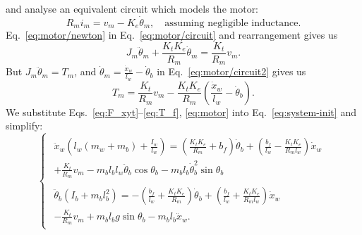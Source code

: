 \documentclass[11pt]{article} %
\begin{document}
and analyse an equivalent circuit which models the motor:
\begin{equation}\label{eq:motor/circuit}
R_m i_m = v_m - K_e \dot{\theta}_m, \quad \text{assuming negligible inductance.}
\end{equation}
Eq.~\eqref{eq:motor/newton} in Eq.~\eqref{eq:motor/circuit} and rearrangement gives us
\begin{equation}\label{eq:motor/circuit2}
  J_m \ddot{\theta}_m
  + \frac{K_t K_e}{R_m} \dot{\theta}_m
  = \frac{K_t}{R_m}v_m.
\end{equation}
But $J_m \ddot{\theta}_m = T_m$, and $\dot{\theta}_m = \frac{\dot{x}_w}{l_w} - \dot{\theta}_b$ in Eq.~\eqref{eq:motor/circuit2} gives us
\begin{equation}\label{eq:motor}
  T_m = \frac{K_t}{R_m}v_m -
  \frac{K_t K_e}{R_m}\left(
    \frac{\dot{x}_w}{l_w}
    - \dot{\theta}_b
  \right).
\end{equation}
We substitute Eqs.~\eqref{eq:F_xyt}--\eqref{eq:T_f}, \eqref{eq:motor} into Eq.~\eqref{eq:system-init} and simplify:
\begin{equation}\label{eq:system}
  \begin{cases}
    \begin{aligned}
      \ddot{x}_w\left(l_w(m_w + m_b) + \frac{I_w}{l_w}\right) =
      \left(
        \frac{K_t K_e}{R_m}
        + b_f
      \right)\dot{\theta}_b
      +
      \left(
        \frac{b_f}{l_w}
        -
        \frac{K_t K_e}{R_m l_w}
      \right)\dot{x}_w
      \\
      + \frac{K_t}{R_m}v_m
      - m_b l_b l_w \ddot{\theta}_b \cos\theta_b
      - m_b l_b \dot{\theta}_b^2 \sin\theta_b
    \end{aligned}\\
    \begin{aligned}
      \ddot{\theta}_b\left(I_b + m_b l_b^2\right)
      =
      -\left(
        \frac{b_f}{l_w}
        +
        \frac{K_t K_e}{R_m}
      \right)\dot{\theta}_b
      + \left(
        \frac{b_f}{l_w} + \frac{K_t K_e}{R_m l_w}
      \right)\dot{x}_w
      \\
      - \frac{K_t}{R_m}v_m
      + m_b l_b g \sin\theta_b
      - m_b l_b \ddot{x}_w.
    \end{aligned}
  \end{cases}
\end{equation}
\end{document}
